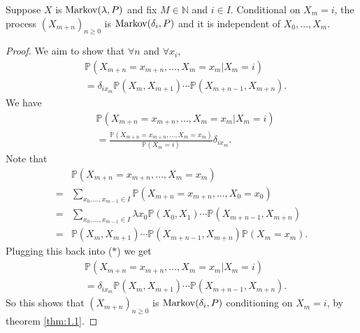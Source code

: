 \documentclass[a4paper,11pt]{article}
\begin{document}
\begin{theorem}\label{thm:simple_markov_property}
    Suppose $ X $ is $ \operatorname{Markov}(\lambda,P) $ and fix $ M\in \mathbb{N}  $ and $ i\in I $. Conditional on $X_m=i$, the process $ (X_{m+n})_{n\ge 0} $ is $ \operatorname{Markov}(\delta_i, P) $ and it is independent of $ X_0,\dots,X_m $.
\end{theorem}
\begin{proof}
    We aim to show that $ \forall n $ and $ \forall x_i $, 
    \[
        \begin{aligned}
            &\mathbb{P}(X_{m+n}=x_{m+n},\dots,X_m=x_m|X_m=i)\\
            &= \delta_{ix_m}\mathbb{P}(X_m,X_{m+1})\cdots \mathbb{P}(X_{m+n-1},X_{m+n}).
        \end{aligned}
    \]
    We have 
    \[
        \begin{aligned}
            &\mathbb{P}(X_{m+n}=x_{m+n},\dots,X_m=x_m|X_m=i)\\ &= \frac{\mathbb{P}(X_{m+n}=x_{m+n},\dots,X_{m}=x_m)}{\mathbb{P}(X_m=i)}\delta_{ix_m}.
        \end{aligned} \tag{$ * $}
    \]
    Note that
    \begin{align*}
        &\mathbb{P}(X_{m+n}=x_{m+n},\dots,X_m=x_m)\\
        =& \sum_{x_0,\dots,x_{m-1}\in I}\mathbb{P}(X_{m+n}=x_{m+n},\dots,X_0=x_0)\tag{Result in IA Probability}\\ 
        =& \sum_{x_0,\dots,x_{m-1}\in I} \lambda x_0 \mathbb{P}(X_0,X_1)\cdots  \mathbb{P}(X_{m+n-1},X_{m+n}) \tag{Since $ X \sim \Markov(\lambda,P) $}\\ 
        =& \mathbb{P}(X_m,X_{m+1})\cdots \mathbb{P}(X_{m+n-1},X_{m+n})\mathbb{P}(X_m=x_m).
    \end{align*}
    Plugging this back into ($ * $) we get 
    \[
        \begin{aligned}
            &\mathbb{P}(X_{m+n}=x_{m+n},\dots,X_m=x_m|X_m=i)\\ &= \delta_{ix_m}\mathbb{P}(X_m,X_{m+1})\cdots \mathbb{P}(X_{m+n-1},X_{m+n}).
        \end{aligned}
    \]
    So this shows that $ (X_{m+n})_{n\ge 0} $ is $ \operatorname{Markov}(\delta_i,P) $ conditioning on $X_m=i$, by theorem \ref{thm:1.1}.


\end{proof}
\end{document}
